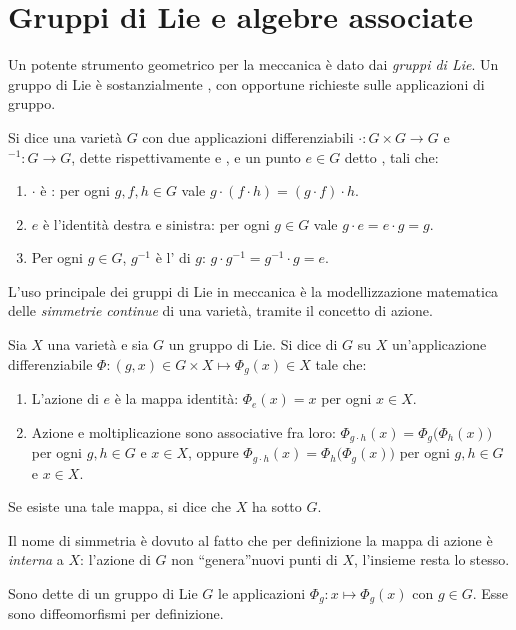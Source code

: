 \section{Gruppi di Lie e algebre associate}
Un potente strumento geometrico per la meccanica è dato dai \emph{gruppi di Lie}. Un gruppo di Lie è sostanzialmente , con opportune richieste sulle applicazioni di gruppo.
\begin{definition}
  Si dice  una varietà $G$ con due applicazioni differenziabili $\cdot: G \times G \to G$ e ${}^{-1}: G\to G$, dette rispettivamente  e , e un punto $e \in G$ detto , tali che:
  \begin{enumerate}
    \item $\cdot $ è : per ogni $g,f,h \in G$ vale $g\cdot (f\cdot h) = (g\cdot f) \cdot h$.
    \item $e$ è l'identità destra e sinistra: per ogni $g \in G$ vale $g \cdot e = e \cdot g = g$.
    \item Per ogni $g \in G$, $g^{-1}$ è l' di $g$: $g \cdot g^{-1} = g^{-1}\cdot g = e$.
  \end{enumerate}
\end{definition}

L'uso principale dei gruppi di Lie in meccanica è la modellizzazione matematica delle \emph{simmetrie continue} di una varietà, tramite il concetto di azione.
\begin{definition}
  Sia $X$ una varietà e sia $G$ un gruppo di Lie. Si dice  di $G$ su $X$ un'applicazione differenziabile $\Phi:(g,x) \in G \times X \mapsto \Phi_g(x) \in X$ tale che:
  \begin{enumerate}
    \item L'azione di $e$ è la mappa identità: $\Phi_e (x) = x$ per ogni $x \in X$.
    \item Azione e moltiplicazione sono associative fra loro: $\Phi_{g\cdot h} (x) = \Phi_g \big(\Phi_h (x)\big)$ per ogni $g,h \in G$ e $x \in X$, oppure $\Phi_{g\cdot h} (x) = \Phi_h \big(\Phi_g (x)\big)$ per ogni $g,h \in G$ e $x \in X$.
  \end{enumerate}
Se esiste una tale mappa, si dice che $X$ ha  sotto $G$. 
\end{definition}
\begin{remark}
  Il nome di simmetria è dovuto al fatto che per definizione la mappa di azione è \emph{interna} a $X$: l'azione di $G$ non \textquotedblleft genera\textquotedblright nuovi punti di $X$, l'insieme resta lo stesso.
\end{remark}
\begin{remark}
  Sono dette  di un gruppo di Lie $G$ le applicazioni $\Phi_g: x \mapsto \Phi_g(x)$ con $g \in G$. Esse sono diffeomorfismi per definizione.
\end{remark}

